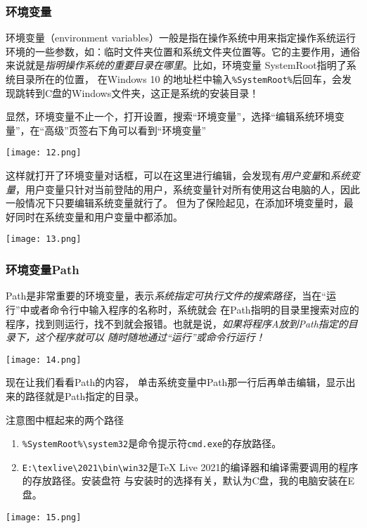 \subsubsection{环境变量}\label{subsub:hjbl}


环境变量（environment variables）一般是指在操作系统中用来指定操作系统运行环境的一些参数，如：临时文件夹位置和系统文件夹位置等。它的主要作用，通俗来说就是\emph{指明操作系统的重要目录在哪里}。比如，环境变量 SystemRoot指明了系统目录所在的位置，
在Windows 10 的地址栏中输入\verb"%SystemRoot%"后回车，会发现跳转到C盘的Windows文件夹，这正是系统的安装目录！

显然，环境变量不止一个，打开设置，搜索“环境变量”，选择“编辑系统环境变量”，在“高级”页签右下角可以看到“环境变量”
\begin{center}
  \texttt{[image: 12.png]}
\end{center}

这样就打开了环境变量对话框，可以在这里进行编辑，会发现有\emph{用户变量}和\emph{系统变量}，用户变量只针对当前登陆的用户，系统变量针对所有使用这台电脑的人，因此一般情况下只要编辑系统变量就行了。
但为了保险起见，在添加环境变量时，最好同时在系统变量和用户变量中都添加。
\begin{center}
  \texttt{[image: 13.png]}
\end{center}




\subsubsection{环境变量Path}\label{subsub:pa}


Path是非常重要的环境变量，表示\emph{系统指定可执行文件的搜索路径}，当在“运行”中或者命令行中输入程序的名称时，系统就会
在Path指明的目录里搜索对应的程序，找到则运行，找不到就会报错。也就是说，\emph{如果将程序A放到Path指定的目录下，这个程序就可以
随时随地通过“运行”或命令行运行！}
\begin{center}
  \texttt{[image: 14.png]}
\end{center}

现在让我们看看Path的内容， 单击系统变量中Path那一行后再单击编辑，显示出来的路径就是Path指定的目录。

注意图中框起来的两个路径
\begin{enumerate}
  \item \verb"%SystemRoot%\system32"是命令提示符\verb"cmd.exe"的存放路径。
  \item \verb"E:\texlive\2021\bin\win32"是\TeX{} Live 2021的编译器和编译需要调用的程序的存放路径。安装盘符
        与安装时的选择有关，默认为C盘，我的电脑安装在E盘。
\end{enumerate}
\begin{center}
  \texttt{[image: 15.png]}
\end{center}

